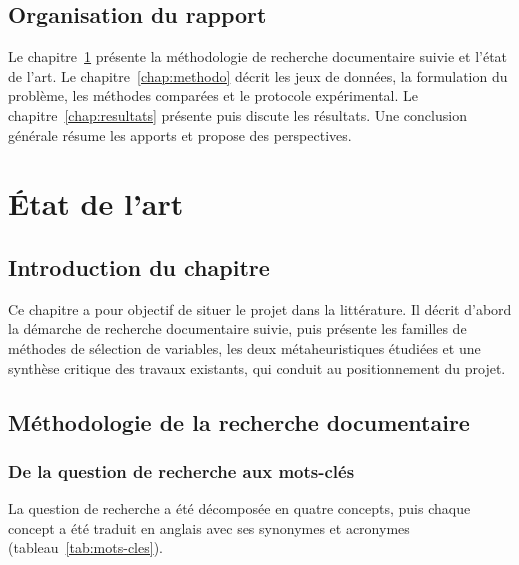 \documentclass[11pt,a4paper]{report}
\begin{document}
\section*{Organisation du rapport}
Le chapitre~\ref{chap:etat-art} présente la méthodologie de recherche documentaire suivie et
l'état de l'art. Le chapitre~\ref{chap:methodo} décrit les jeux de données, la formulation du
problème, les méthodes comparées et le protocole expérimental. Le chapitre~\ref{chap:resultats}
présente puis discute les résultats. Une conclusion générale résume les apports et propose des
perspectives.

\chapter{État de l'art}
\label{chap:etat-art}
\section{Introduction du chapitre}
Ce chapitre a pour objectif de situer le projet dans la littérature. Il décrit d'abord la
démarche de recherche documentaire suivie, puis présente les familles de méthodes de sélection
de variables, les deux métaheuristiques étudiées et une synthèse critique des travaux existants,
qui conduit au positionnement du projet.

\section{Méthodologie de la recherche documentaire}
\label{sec:recherche-doc}

\subsection{De la question de recherche aux mots-clés}
La question de recherche a été décomposée en quatre concepts, puis chaque concept a été traduit
en anglais avec ses synonymes et acronymes (tableau~\ref{tab:mots-cles}).
\end{document}

